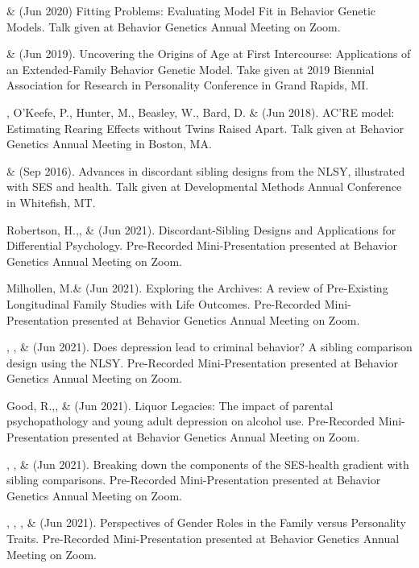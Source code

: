 \item \meb \& \Joe (Jun 2020) Fitting Problems: Evaluating Model Fit in Behavior Genetic Models. Talk given at Behavior Genetics Annual Meeting on Zoom.
%
\item \meb \& \Joe (Jun 2019). Uncovering the Origins of Age at First Intercourse: Applications of an Extended-Family Behavior Genetic Model. Take given at 2019 Biennial Association for Research in Personality Conference in Grand Rapids, MI.
%
\item\meb, O'Keefe, P., Hunter, M., Beasley, W., Bard, D. \& \Joe (Jun 2018). AC'RE model: Estimating Rearing Effects without Twins Raised Apart. Talk given at Behavior Genetics Annual Meeting in Boston, MA.
%
\item\meb \& \joe (Sep 2016). Advances in discordant sibling designs from the NLSY, illustrated with SES and health. Talk given at Developmental Methods Annual Conference in Whitefish, MT.\medskip\\
%
%
%
\item Robertson, H.,\noteA \Joe, \&  \meb (Jun 2021). Discordant-Sibling Designs and Applications for Differential Psychology. Pre-Recorded Mini-Presentation presented at Behavior Genetics Annual Meeting on Zoom.
%
\item Milhollen, M.\noteA \&  \meb (Jun 2021). Exploring the Archives: A review of Pre-Existing Longitudinal Family Studies with Life Outcomes. Pre-Recorded Mini-Presentation presented at Behavior Genetics Annual Meeting on Zoom.
%
\item \emsims, \jt, \&  \meb (Jun 2021). Does depression lead to criminal behavior? A sibling comparison design using the NLSY. Pre-Recorded Mini-Presentation presented at Behavior Genetics Annual Meeting on Zoom.
%
\item Good, R.,\noteA \yrh, \&  \meb (Jun 2021). Liquor Legacies: The impact of parental psychopathology and young adult depression on alcohol use. Pre-Recorded Mini-Presentation presented at Behavior Genetics Annual Meeting on Zoom.
%
\item \yrh, \jt, \& \meb (Jun 2021). Breaking down the components of the SES-health gradient with sibling comparisons. Pre-Recorded Mini-Presentation presented at Behavior Genetics Annual Meeting on Zoom.
%
\item \sherrym, \yrh, \jt, \& \meb (Jun 2021). Perspectives of Gender Roles in the Family versus Personality Traits.  Pre-Recorded Mini-Presentation presented at Behavior Genetics Annual Meeting on Zoom.
